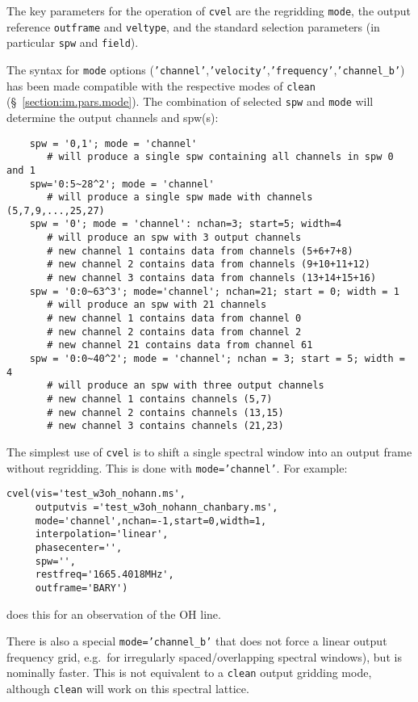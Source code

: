 The key parameters for the operation of {\tt cvel} are the regridding
{\tt mode}, the output reference {\tt outframe} and {\tt veltype}, and
the standard selection parameters (in particular {\tt spw} and {\tt field}).

The syntax for {\tt mode} options 
({\tt 'channel'},{\tt 'velocity'},{\tt 'frequency'},{\tt 'channel\_b'})
has been made compatible with the
respective modes of {\tt clean} (\S~\ref{section:im.pars.mode}).  The
combination of selected {\tt spw} and {\tt mode} will determine the
output channels and spw(s):
\small
\begin{verbatim}
    spw = '0,1'; mode = 'channel'
       # will produce a single spw containing all channels in spw 0 and 1
    spw='0:5~28^2'; mode = 'channel'
       # will produce a single spw made with channels (5,7,9,...,25,27)
    spw = '0'; mode = 'channel': nchan=3; start=5; width=4
       # will produce an spw with 3 output channels
       # new channel 1 contains data from channels (5+6+7+8)
       # new channel 2 contains data from channels (9+10+11+12)
       # new channel 3 contains data from channels (13+14+15+16)
    spw = '0:0~63^3'; mode='channel'; nchan=21; start = 0; width = 1
       # will produce an spw with 21 channels
       # new channel 1 contains data from channel 0
       # new channel 2 contains data from channel 2
       # new channel 21 contains data from channel 61
    spw = '0:0~40^2'; mode = 'channel'; nchan = 3; start = 5; width = 4
       # will produce an spw with three output channels
       # new channel 1 contains channels (5,7)
       # new channel 2 contains channels (13,15)
       # new channel 3 contains channels (21,23)
\end{verbatim}
\normalsize

The simplest use of {\tt cvel} is to shift a single spectral window
into an output frame without regridding.  This is done with 
{\tt mode='channel'}.  For example:
\small
\begin{verbatim}
cvel(vis='test_w3oh_nohann.ms',
     outputvis ='test_w3oh_nohann_chanbary.ms',
     mode='channel',nchan=-1,start=0,width=1,
     interpolation='linear',
     phasecenter='',
     spw='',
     restfreq='1665.4018MHz',
     outframe='BARY')
\end{verbatim}
\normalsize
does this for an observation of the OH line.

There is also a special {\tt mode='channel\_b'} that does not force a
linear output frequency grid, e.g.\ for irregularly spaced/overlapping
spectral windows), but is nominally faster.  This is not equivalent to
a {\tt clean} output gridding mode, although {\tt clean} will
work on this spectral lattice.

